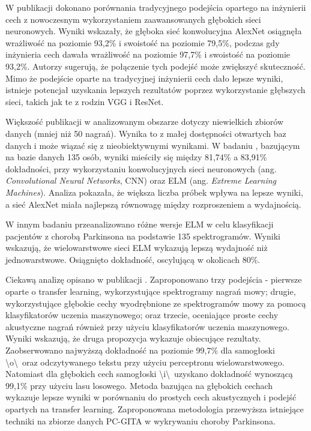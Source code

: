 W publikacji \cite{Majda-Zdancewicz_Potulska-Chromik_Jakubowski_Nojszewska_Kostera-Pruszczyk} dokonano porównania tradycyjnego podejścia opartego na
inżynierii cech z nowoczesnym wykorzystaniem zaawansowanych głębokich sieci neuronowych.
Wyniki wskazały, że głęboka sieć konwolucyjna AlexNet osiągnęła wrażliwość na poziomie 93,2\% i swoistość na poziomie 79,5\%, podczas gdy inżynieria
cech dawała wrażliwość na poziomie 97,7\% i swoistość na poziomie 93,2\%.
Autorzy sugerują, że połączenie tych podejść może zwiększyć skuteczność.
Mimo że podejście oparte na tradycyjnej inżynierii cech dało lepsze wyniki, istnieje potencjał uzyskania lepszych rezultatów poprzez wykorzystanie
głębszych sieci, takich jak te z rodzin VGG i ResNet.

Większość publikacji w analizowanym obszarze dotyczy niewielkich zbiorów danych (mniej niż 50 nagrań).
Wynika to z małej dostępności otwartych baz danych i może wiązać się z nieobiektywnymi wynikami.
W badaniu \cite{GUATELLI2023106700}, bazującym na bazie danych 135 osób, wyniki mieściły się między 81,74\% a 83,91\% dokładności,
przy wykorzystaniu konwolucyjnych sieci neuronowych (ang. \emph{Convolutional Neural Networks}, CNN) oraz ELM (ang. \emph{Extreme Learning Machines}).
Analiza pokazała, że większa liczba próbek wpływa na lepsze wyniki, a sieć AlexNet miała najlepszą równowagę między rozproszeniem a wydajnością.

W innym badaniu \cite{Gelvez-Almeida_2022} przeanalizowano różne wersje ELM w celu klasyfikacji pacjentów z chorobą Parkinsona na podstawie 135 spektrogramów.
Wyniki wskazują, że wielowarstwowe sieci ELM wykazują lepszą wydajność niż jednowarstwowe.
Osiągnięto dokładność, oscylującą w okolicach 80\%.

Ciekawą analizę opisano w publikacji \cite{8999815}. Zaproponowano trzy podejścia - pierwsze oparte o transfer learning, wykorzystujące spektrogramy nagrań
mowy; drugie, wykorzystujące głębokie cechy wyodrębnione ze spektrogramów mowy za pomocą klasyfikatorów uczenia maszynowego; oraz trzecie, oceniające
proste cechy akustyczne nagrań również przy użyciu klasyfikatorów uczenia maszynowego.
Wyniki wskazują, że druga propozycja wykazuje obiecujące rezultaty.
Zaobserwowano najwyższą dokładność na poziomie 99,7\% dla samogłoski \textbackslash o\textbackslash\ oraz odczytywanego tekstu przy użyciu perceptronu wielowarstwowego.
Natomiast dla głębokich cech samogłoski \textbackslash i\textbackslash\ uzyskano dokładność wynoszącą 99,1\% przy użyciu lasu losowego.
Metoda bazująca na głębokich cechach wykazuje lepsze wyniki w porównaniu do prostych cech akustycznych i podejść opartych na transfer learning.
Zaproponowana metodologia przewyższa istniejące techniki na zbiorze danych PC-GITA w wykrywaniu choroby Parkinsona.

